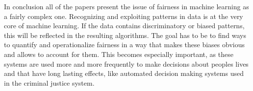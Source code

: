 In conclusion all of the papers present the issue of fairness in machine
learning as a fairly complex one. Recognizing and exploiting patterns in 
data is at the very core of machine learning. If the data contains
discriminatory or biased patterns, this will be reflected in the resulting
algorithms. The goal has to be to find ways to quantify and operationalize
fairness in a way that makes these biases obvious and allows to account for
them. This becomes especially important, as these systems are used more
and more frequently to make decisions about peoples lives and that have long
lasting effects, like automated decision making systems used in the 
criminal justice system.